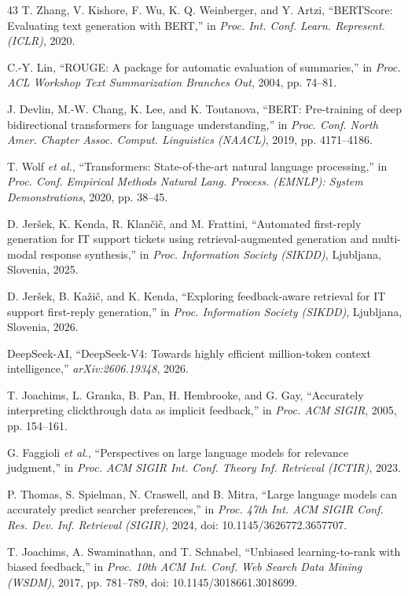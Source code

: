 \begin{thebibliography}{43}
 T. Zhang, V. Kishore, F. Wu, K. Q. Weinberger, and Y. Artzi, ``BERTScore: Evaluating text generation with BERT,'' in \emph{Proc. Int. Conf. Learn. Represent. (ICLR)}, 2020.

 C.-Y. Lin, ``ROUGE: A package for automatic evaluation of summaries,'' in \emph{Proc. ACL Workshop Text Summarization Branches Out}, 2004, pp. 74--81.

 J. Devlin, M.-W. Chang, K. Lee, and K. Toutanova, ``BERT: Pre-training of deep bidirectional transformers for language understanding,'' in \emph{Proc. Conf. North Amer. Chapter Assoc. Comput. Linguistics (NAACL)}, 2019, pp. 4171--4186.

 T. Wolf \emph{et al.}, ``Transformers: State-of-the-art natural language processing,'' in \emph{Proc. Conf. Empirical Methods Natural Lang. Process. (EMNLP): System Demonstrations}, 2020, pp. 38--45.

 D. Jer\v{s}ek, K. Kenda, R. Klan\v{c}i\v{c}, and M. Frattini, ``Automated first-reply generation for IT support tickets using retrieval-augmented generation and multi-modal response synthesis,'' in \emph{Proc. Information Society (SIKDD)}, Ljubljana, Slovenia, 2025.

 D. Jer\v{s}ek, B. Ka\v{z}i\v{c}, and K. Kenda, ``Exploring feedback-aware retrieval for IT support first-reply generation,'' in \emph{Proc. Information Society (SIKDD)}, Ljubljana, Slovenia, 2026.

 DeepSeek-AI, ``DeepSeek-V4: Towards highly efficient million-token context intelligence,'' \emph{arXiv:2606.19348}, 2026.

 T. Joachims, L. Granka, B. Pan, H. Hembrooke, and G. Gay, ``Accurately interpreting clickthrough data as implicit feedback,'' in \emph{Proc. ACM SIGIR}, 2005, pp. 154--161.

 G. Faggioli \emph{et al.}, ``Perspectives on large language models for relevance judgment,'' in \emph{Proc. ACM SIGIR Int. Conf. Theory Inf. Retrieval (ICTIR)}, 2023.

 P. Thomas, S. Spielman, N. Craswell, and B. Mitra, ``Large language models can accurately predict searcher preferences,'' in \emph{Proc. 47th Int. ACM SIGIR Conf. Res. Dev. Inf. Retrieval (SIGIR)}, 2024, doi: 10.1145/3626772.3657707.

 T. Joachims, A. Swaminathan, and T. Schnabel, ``Unbiased learning-to-rank with biased feedback,'' in \emph{Proc. 10th ACM Int. Conf. Web Search Data Mining (WSDM)}, 2017, pp. 781--789, doi: 10.1145/3018661.3018699.


\end{thebibliography}
